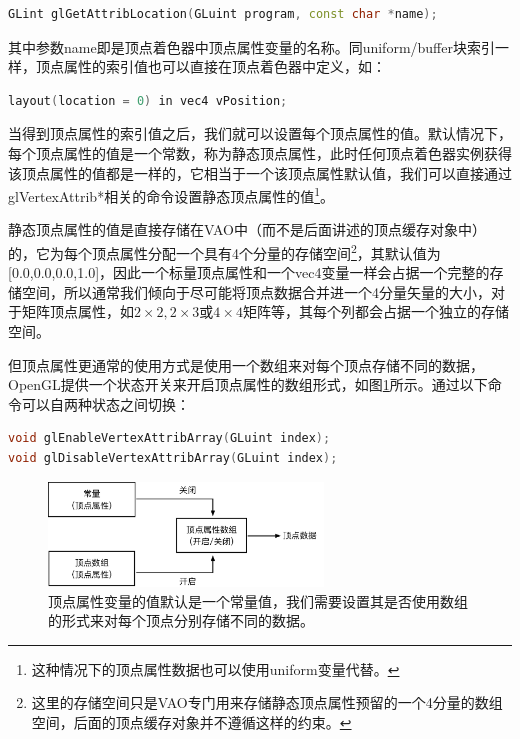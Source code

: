 \begin{lstlisting}[language=C++]
GLint glGetAttribLocation​(GLuint program​, const char *name​);
\end{lstlisting}

其中参数name即是顶点着色器中顶点属性变量的名称。同uniform/buffer块索引一样，顶点属性的索引值也可以直接在顶点着色器中定义，如：

\begin{lstlisting}[language=C++]
layout(location = 0) in vec4 vPosition;
\end{lstlisting}

当得到顶点属性的索引值之后，我们就可以设置每个顶点属性的值。默认情况下，每个顶点属性的值是一个常数，称为静态顶点属性，此时任何顶点着色器实例获得该顶点属性的值都是一样的，它相当于一个该顶点属性默认值，我们可以直接通过glVertexAttrib*相关的命令设置静态顶点属性的值\footnote{这种情况下的顶点属性数据也可以使用uniform变量代替。}。

静态顶点属性的值是直接存储在VAO中（而不是后面讲述的顶点缓存对象中）的，它为每个顶点属性分配一个具有4个分量的存储空间\footnote{这里的存储空间只是VAO专门用来存储静态顶点属性预留的一个4分量的数组空间，后面的顶点缓存对象并不遵循这样的约束。}，其默认值为[0.0,0.0,0.0,1.0]，因此一个标量顶点属性和一个vec4变量一样会占据一个完整的存储空间，所以通常我们倾向于尽可能将顶点数据合并进一个4分量矢量的大小，对于矩阵顶点属性，如$2\times 2, 2\times 3$或$4\times 4$矩阵等，其每个列都会占据一个独立的存储空间。

但顶点属性更通常的使用方式是使用一个数组来对每个顶点存储不同的数据，OpenGL提供一个状态开关来开启顶点属性的数组形式，如图\ref{f:api-vertex-array}所示。​通过以下命令可以自两种状态之间切换：

\begin{lstlisting}[language=C++]
void glEnableVertexAttribArray(GLuint index​);
void glDisableVertexAttribArray(GLuint index​);
\end{lstlisting}

\begin{figure}
	\sidecaption
	\includegraphics[width=0.65\textwidth]{figures/api/vertex}
	\caption{顶点属性变量的值默认是一个常量值，我们需要设置其是否使用数组的形式来对每个顶点分别存储不同的数据。}
	\label{f:api-vertex-array}
\end{figure}





